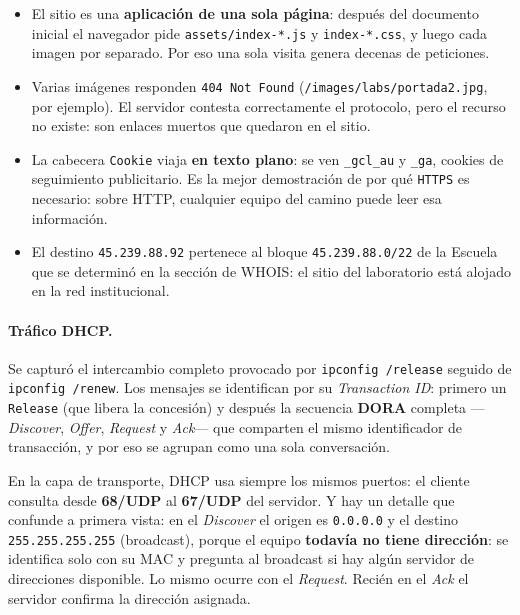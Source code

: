 \documentclass[11pt,a4paper]{report}
\begin{document}
\begin{itemize}
  \item El sitio es una \textbf{aplicación de una sola página}: después del documento
        inicial el navegador pide \texttt{assets/index-*.js} y \texttt{index-*.css}, y
        luego cada imagen por separado. Por eso una sola visita genera decenas de
        peticiones.
  \item Varias imágenes responden \texttt{404 Not Found}
        (\texttt{/images/labs/portada2.jpg}, por ejemplo). El servidor contesta
        correctamente el protocolo, pero el recurso no existe: son enlaces muertos que
        quedaron en el sitio.
  \item La cabecera \texttt{Cookie} viaja \textbf{en texto plano}: se ven
        \texttt{\_gcl\_au} y \texttt{\_ga}, cookies de seguimiento publicitario. Es la
        mejor demostración de por qué \texttt{HTTPS} es necesario: sobre HTTP,
        cualquier equipo del camino puede leer esa información.
  \item El destino \texttt{45.239.88.92} pertenece al bloque \texttt{45.239.88.0/22}
        de la Escuela que se determinó en la sección de WHOIS: el sitio del
        laboratorio está alojado en la red institucional.
\end{itemize}

\paragraph{Tráfico DHCP.} Se capturó el intercambio completo provocado por
\texttt{ipconfig /release} seguido de \texttt{ipconfig /renew}. Los mensajes se
identifican por su \emph{Transaction ID}: primero un \texttt{Release} (que libera la
concesión) y después la secuencia \textbf{DORA} completa ---\emph{Discover},
\emph{Offer}, \emph{Request} y \emph{Ack}--- que comparten el mismo identificador de
transacción, y por eso se agrupan como una sola conversación.

En la capa de transporte, DHCP usa siempre los mismos puertos: el cliente consulta
desde \textbf{68/UDP} al \textbf{67/UDP} del servidor. Y hay un detalle que confunde
a primera vista: en el \emph{Discover} el origen es \texttt{0.0.0.0} y el destino
\texttt{255.255.255.255} (broadcast), porque el equipo \textbf{todavía no tiene
dirección}: se identifica solo con su MAC y pregunta al broadcast si hay algún
servidor de direcciones disponible. Lo mismo ocurre con el \emph{Request}. Recién en
el \emph{Ack} el servidor confirma la dirección asignada.
\end{document}
